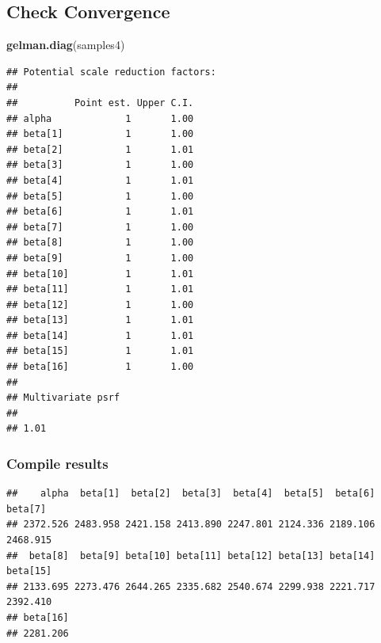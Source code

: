 \documentclass[
]{article}
\newenvironment{Shaded}{\begin{snugshade}}{\end{snugshade}}
\newcommand{\FunctionTok}[1]{\textcolor[rgb]{0.13,0.29,0.53}{\textbf{#1}}}
\newcommand{\NormalTok}[1]{#1}
\newcommand{\OtherTok}[1]{\textcolor[rgb]{0.56,0.35,0.01}{#1}}
\newcommand{\SpecialCharTok}[1]{\textcolor[rgb]{0.81,0.36,0.00}{\textbf{#1}}}
\begin{document}
\subsection{Check Convergence}\label{check-convergence-3}

\begin{Shaded}
\begin{Highlighting}[]
\FunctionTok{gelman.diag}\NormalTok{(samples4)}
\end{Highlighting}
\end{Shaded}

\begin{verbatim}
## Potential scale reduction factors:
## 
##          Point est. Upper C.I.
## alpha             1       1.00
## beta[1]           1       1.00
## beta[2]           1       1.01
## beta[3]           1       1.00
## beta[4]           1       1.01
## beta[5]           1       1.00
## beta[6]           1       1.01
## beta[7]           1       1.00
## beta[8]           1       1.00
## beta[9]           1       1.00
## beta[10]          1       1.01
## beta[11]          1       1.01
## beta[12]          1       1.00
## beta[13]          1       1.01
## beta[14]          1       1.01
## beta[15]          1       1.01
## beta[16]          1       1.00
## 
## Multivariate psrf
## 
## 1.01
\end{verbatim}

\subsubsection{Compile results}\label{compile-results-3}

\begin{Shaded}
\end{Shaded}

\begin{verbatim}
##    alpha  beta[1]  beta[2]  beta[3]  beta[4]  beta[5]  beta[6]  beta[7] 
## 2372.526 2483.958 2421.158 2413.890 2247.801 2124.336 2189.106 2468.915 
##  beta[8]  beta[9] beta[10] beta[11] beta[12] beta[13] beta[14] beta[15] 
## 2133.695 2273.476 2644.265 2335.682 2540.674 2299.938 2221.717 2392.410 
## beta[16] 
## 2281.206
\end{verbatim}
\end{document}

